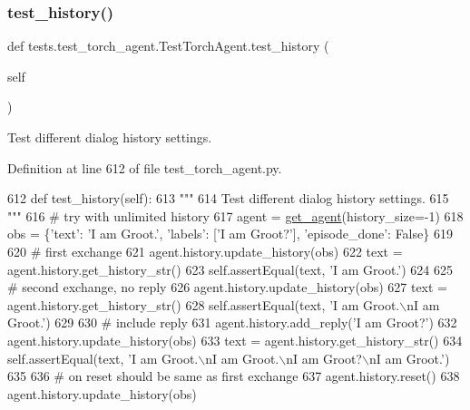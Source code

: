 \subsubsection{\texorpdfstring{test\+\_\+history()}{test\_history()}}
{\footnotesize\ttfamily def tests.\+test\+\_\+torch\+\_\+agent.\+Test\+Torch\+Agent.\+test\+\_\+history (\begin{DoxyParamCaption}\item[{}]{self }\end{DoxyParamCaption})}

\begin{DoxyVerb}Test different dialog history settings.
\end{DoxyVerb}
 

Definition at line 612 of file test\+\_\+torch\+\_\+agent.\+py.


\begin{DoxyCode}
612     \textcolor{keyword}{def }test\_history(self):
613         \textcolor{stringliteral}{"""}
614 \textcolor{stringliteral}{        Test different dialog history settings.}
615 \textcolor{stringliteral}{        """}
616         \textcolor{comment}{# try with unlimited history}
617         agent = \hyperlink{namespacetests_1_1test__torch__agent_ae929d109305aaea29fbfa13ecf1f32e9}{get\_agent}(history\_size=-1)
618         obs = \{\textcolor{stringliteral}{'text'}: \textcolor{stringliteral}{'I am Groot.'}, \textcolor{stringliteral}{'labels'}: [\textcolor{stringliteral}{'I am Groot?'}], \textcolor{stringliteral}{'episode\_done'}: \textcolor{keyword}{False}\}
619 
620         \textcolor{comment}{# first exchange}
621         agent.history.update\_history(obs)
622         text = agent.history.get\_history\_str()
623         self.assertEqual(text, \textcolor{stringliteral}{'I am Groot.'})
624 
625         \textcolor{comment}{# second exchange, no reply}
626         agent.history.update\_history(obs)
627         text = agent.history.get\_history\_str()
628         self.assertEqual(text, \textcolor{stringliteral}{'I am Groot.\(\backslash\)nI am Groot.'})
629 
630         \textcolor{comment}{# include reply}
631         agent.history.add\_reply(\textcolor{stringliteral}{'I am Groot?'})
632         agent.history.update\_history(obs)
633         text = agent.history.get\_history\_str()
634         self.assertEqual(text, \textcolor{stringliteral}{'I am Groot.\(\backslash\)nI am Groot.\(\backslash\)nI am Groot?\(\backslash\)nI am Groot.'})
635 
636         \textcolor{comment}{# on reset should be same as first exchange}
637         agent.history.reset()
638         agent.history.update\_history(obs)

\end{DoxyCode}
